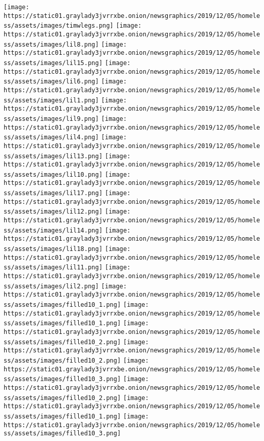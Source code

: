 \texttt{[image: https://static01.graylady3jvrrxbe.onion/newsgraphics/2019/12/05/homeless/assets/images/timwlegs.png]}
\texttt{[image: https://static01.graylady3jvrrxbe.onion/newsgraphics/2019/12/05/homeless/assets/images/lil8.png]}
\texttt{[image: https://static01.graylady3jvrrxbe.onion/newsgraphics/2019/12/05/homeless/assets/images/lil15.png]}
\texttt{[image: https://static01.graylady3jvrrxbe.onion/newsgraphics/2019/12/05/homeless/assets/images/lil6.png]}
\texttt{[image: https://static01.graylady3jvrrxbe.onion/newsgraphics/2019/12/05/homeless/assets/images/lil1.png]}
\texttt{[image: https://static01.graylady3jvrrxbe.onion/newsgraphics/2019/12/05/homeless/assets/images/lil9.png]}
\texttt{[image: https://static01.graylady3jvrrxbe.onion/newsgraphics/2019/12/05/homeless/assets/images/lil4.png]}
\texttt{[image: https://static01.graylady3jvrrxbe.onion/newsgraphics/2019/12/05/homeless/assets/images/lil13.png]}
\texttt{[image: https://static01.graylady3jvrrxbe.onion/newsgraphics/2019/12/05/homeless/assets/images/lil10.png]}
\texttt{[image: https://static01.graylady3jvrrxbe.onion/newsgraphics/2019/12/05/homeless/assets/images/lil17.png]}
\texttt{[image: https://static01.graylady3jvrrxbe.onion/newsgraphics/2019/12/05/homeless/assets/images/lil12.png]}
\texttt{[image: https://static01.graylady3jvrrxbe.onion/newsgraphics/2019/12/05/homeless/assets/images/lil14.png]}
\texttt{[image: https://static01.graylady3jvrrxbe.onion/newsgraphics/2019/12/05/homeless/assets/images/lil18.png]}
\texttt{[image: https://static01.graylady3jvrrxbe.onion/newsgraphics/2019/12/05/homeless/assets/images/lil11.png]}
\texttt{[image: https://static01.graylady3jvrrxbe.onion/newsgraphics/2019/12/05/homeless/assets/images/lil2.png]}
\texttt{[image: https://static01.graylady3jvrrxbe.onion/newsgraphics/2019/12/05/homeless/assets/images/filled10\_1.png]}
\texttt{[image: https://static01.graylady3jvrrxbe.onion/newsgraphics/2019/12/05/homeless/assets/images/filled10\_1.png]}
\texttt{[image: https://static01.graylady3jvrrxbe.onion/newsgraphics/2019/12/05/homeless/assets/images/filled10\_2.png]}
\texttt{[image: https://static01.graylady3jvrrxbe.onion/newsgraphics/2019/12/05/homeless/assets/images/filled10\_2.png]}
\texttt{[image: https://static01.graylady3jvrrxbe.onion/newsgraphics/2019/12/05/homeless/assets/images/filled10\_3.png]}
\texttt{[image: https://static01.graylady3jvrrxbe.onion/newsgraphics/2019/12/05/homeless/assets/images/filled10\_2.png]}
\texttt{[image: https://static01.graylady3jvrrxbe.onion/newsgraphics/2019/12/05/homeless/assets/images/filled10\_1.png]}
\texttt{[image: https://static01.graylady3jvrrxbe.onion/newsgraphics/2019/12/05/homeless/assets/images/filled10\_3.png]}
